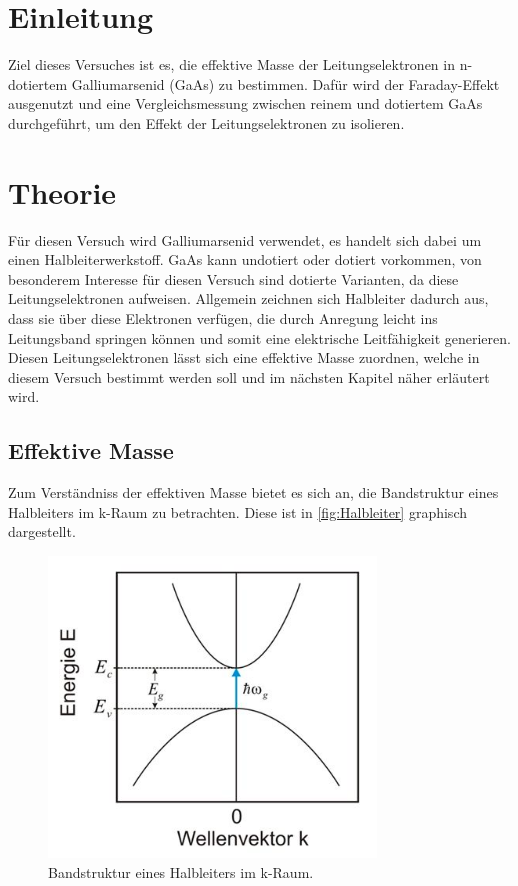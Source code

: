 \section{Einleitung}
\label{sec:Einleitung}

Ziel dieses Versuches ist es, die effektive Masse der Leitungselektronen in n-dotiertem
Galliumarsenid (GaAs) zu bestimmen. Dafür wird der Faraday-Effekt ausgenutzt und eine Vergleichsmessung
zwischen reinem und dotiertem GaAs durchgeführt, um den Effekt der Leitungselektronen zu isolieren.

\section{Theorie}
\label{sec:Theorie}

Für diesen Versuch wird Galliumarsenid verwendet, es handelt sich dabei um einen Halbleiterwerkstoff.
GaAs kann undotiert oder dotiert vorkommen, von besonderem Interesse für diesen Versuch sind dotierte
Varianten, da diese Leitungselektronen aufweisen. Allgemein zeichnen sich Halbleiter
dadurch aus, dass sie über diese Elektronen verfügen, die durch Anregung leicht ins Leitungsband springen
können und somit eine elektrische Leitfähigkeit generieren. Diesen Leitungselektronen lässt sich
eine effektive Masse zuordnen, welche in diesem Versuch bestimmt werden soll und im nächsten Kapitel
näher erläutert wird.

\subsection{Effektive Masse}

Zum Verständniss der effektiven Masse bietet es sich an, die Bandstruktur eines Halbleiters im k-Raum
zu betrachten. Diese ist in \autoref{fig:Halbleiter} graphisch dargestellt.

\begin{figure} [H]
    \centering
    \includegraphics[height=8cm]{content/Halbleiter.png}
    \caption{Bandstruktur eines Halbleiters im k-Raum. \cite{Halbleiter}}
    \label{fig:Halbleiter}
\end{figure}

